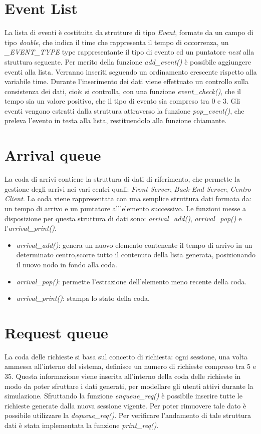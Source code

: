 \section{Event List}
La lista di eventi è costituita da strutture di tipo \textit{Event}, formate da un campo di tipo \textit{double}, che indica il time che rappresenta il tempo di occorrenza, un \textit{\_EVENT\_TYPE} type rappresentante il tipo di evento ed un puntatore \textit{next} alla struttura seguente.
Per merito della funzione \textit{add\_event()} è possibile aggiungere eventi alla lista. Verranno inseriti seguendo un ordinamento crescente rispetto alla variabile time. Durante l'inserimento dei dati viene effettuato un controllo sulla consistenza dei dati, cioè: si controlla, con una funzione \textit{event\_check()}, che il tempo sia un valore positivo, che il tipo di evento sia compreso tra 0 e 3.
Gli eventi vengono estratti dalla struttura attraverso la funzione \textit{pop\_event()}, che preleva l'evento in testa alla lista, restituendolo alla funzione chiamante.

\section{Arrival queue}
La coda di arrivi contiene la struttura di dati di riferimento, che permette la gestione degli arrivi nei vari centri quali: \textit{Front Server}, \textit{Back-End Server}, \textit{Centro Client}. La coda viene rappresentata con una semplice struttura dati formata da: un tempo di arrivo e un puntatore all'elemento successivo. Le funzioni messe a disposizione per questa struttura di dati sono: \textit{arrival\_add()}, \textit{arrival\_pop()} e l'\textit{arrival\_print()}.
\begin{itemize}
\item \textit{arrival\_add()}: genera un nuovo elemento contenente il tempo di arrivo in un determinato centro,scorre tutto il contenuto della lista generata, posizionando il nuovo nodo in fondo alla coda.
\item \textit{arrival\_pop()}: permette l'estrazione dell'elemento meno recente della coda.
\item \textit{arrival\_print()}: stampa lo stato della coda.
\end{itemize}

\section{Request queue}
La coda delle richieste si basa sul concetto di richiesta: ogni sessione, una volta ammessa all'interno del sistema, definisce un numero di richieste compreso tra 5 e 35. Questa informazione viene inserita all'interno della coda delle richieste in modo da poter sfruttare i dati generati, per modellare gli utenti attivi durante la simulazione.
Sfruttando la funzione \textit{enqueue\_req()} è possibile inserire tutte le richieste generate dalla nuova sessione vigente. Per poter rimuovere tale dato è possibile  utilizzare la \textit{dequeue\_req()}.
Per verificare l'andamento di tale struttura dati è stata implementata la funzione \textit{print\_req()}.

